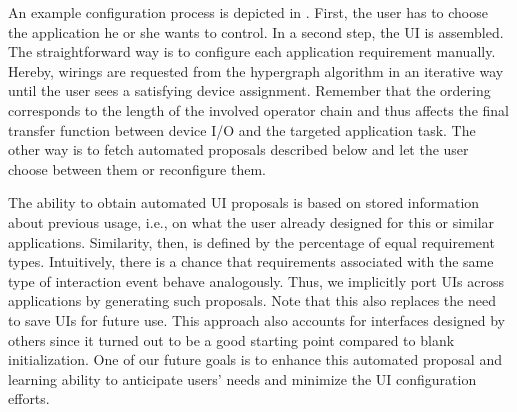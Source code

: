 \documentclass[twoside,twocolumn,10pt]{article}
\begin{document}
%
An example configuration process is depicted in .
First, the user has to choose the application he or she wants to control.
In a second step, the UI is assembled.
The straightforward way is to configure each application requirement manually.
Hereby, wirings are requested from the hypergraph algorithm in an iterative way until the user sees a satisfying device assignment.
Remember that the ordering corresponds to the length of the involved operator chain and thus affects the final transfer function between device I/O and the targeted application task.
The other way is to fetch automated proposals described below and let the user choose between them or reconfigure them.



%
%
The ability to obtain automated UI proposals is based on stored information about previous usage, i.e., on what the user already designed for this or similar applications.
Similarity, then, is defined by the percentage of equal requirement types.
Intuitively, there is a chance that requirements associated with the same type of interaction event behave analogously.
Thus, we implicitly port UIs across applications by generating such proposals.
Note that this also replaces the need to save UIs for future use.
This approach also accounts for interfaces designed by others since it turned out to be a good starting point compared to blank initialization.
One of our future goals is to enhance this automated proposal and learning ability to anticipate users' needs and minimize the UI configuration efforts.



%
\end{document}
